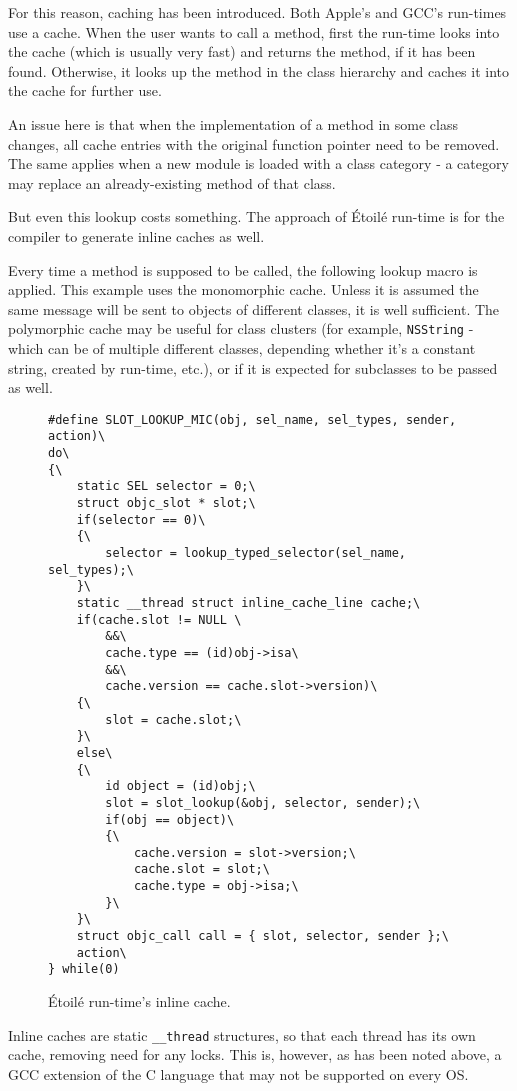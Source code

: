 For this reason, caching has been introduced. Both Apple's and GCC's run-times use a cache. When the user wants to call a method, first the run-time looks into the cache (which is usually very fast) and returns the method, if it has been found. Otherwise, it looks up the method in the class hierarchy and caches it into the cache for further use.

An issue here is that when the implementation of a method in some class changes, all cache entries with the original function pointer need to be removed. The same applies when a new module is loaded with a class category - a category may replace an already-existing method of that class.

But even this lookup costs something. The approach of \'Etoil\'e run-time is for the compiler to generate inline caches as well.

Every time a method is supposed to be called, the following lookup macro is applied. This example uses the monomorphic cache. Unless it is assumed the same message will be sent to objects of different classes, it is well sufficient. The polymorphic cache may be useful for class clusters (for example, \verb=NSString= - which can be of multiple different classes, depending whether it's a constant string, created by run-time, etc.), or if it is expected for subclasses to be passed as well.

\begin{figure}[H]
\begin{verbatim}
#define SLOT_LOOKUP_MIC(obj, sel_name, sel_types, sender, action)\
do\
{\
    static SEL selector = 0;\
    struct objc_slot * slot;\
    if(selector == 0)\
    {\
        selector = lookup_typed_selector(sel_name, sel_types);\
    }\
    static __thread struct inline_cache_line cache;\
    if(cache.slot != NULL \
        &&\
        cache.type == (id)obj->isa\
        &&\
        cache.version == cache.slot->version)\
    {\
        slot = cache.slot;\
    }\
    else\
    {\
        id object = (id)obj;\
        slot = slot_lookup(&obj, selector, sender);\
        if(obj == object)\
        {\
            cache.version = slot->version;\
            cache.slot = slot;\
            cache.type = obj->isa;\
        }\
    }\
    struct objc_call call = { slot, selector, sender };\
    action\
} while(0)
\end{verbatim}
  \centering{}
  \caption{\'Etoil\'e run-time's inline cache.}
  \label{fig:etoile_inline_cache}
\end{figure}


Inline caches are static \verb=__thread= structures, so that each thread has its own cache, removing need for any locks. This is, however, as has been noted above, a GCC extension of the C language that may not be supported on every OS.

